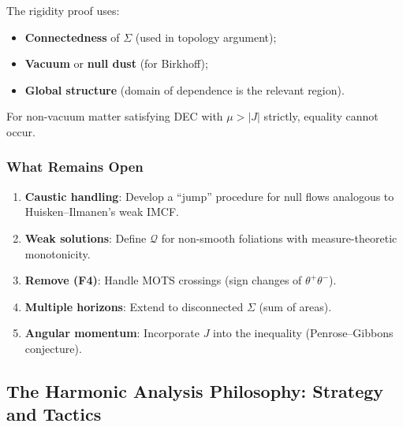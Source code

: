 \begin{remark}
The rigidity proof uses:
\begin{itemize}
\item \textbf{Connectedness} of $\Sigma$ (used in topology argument);
\item \textbf{Vacuum} or \textbf{null dust} (for Birkhoff);
\item \textbf{Global structure} (domain of dependence is the relevant region).
\end{itemize}
For non-vacuum matter satisfying DEC with $\mu > |J|$ strictly, equality cannot occur.
\end{remark}

\subsubsection{What Remains Open}

\begin{remark}
\begin{enumerate}
\item \textbf{Caustic handling}: Develop a ``jump'' procedure for null flows analogous to Huisken--Ilmanen's weak IMCF.
\item \textbf{Weak solutions}: Define $\mathcal{Q}$ for non-smooth foliations with measure-theoretic monotonicity.
\item \textbf{Remove (F4)}: Handle MOTS crossings (sign changes of $\theta^+\theta^-$).
\item \textbf{Multiple horizons}: Extend to disconnected $\Sigma$ (sum of areas).
\item \textbf{Angular momentum}: Incorporate $J$ into the inequality (Penrose--Gibbons conjecture).
\end{enumerate}
\end{remark}



\subsection{The Harmonic Analysis Philosophy: Strategy and Tactics}\label{subsec:harmonic-philosophy}

